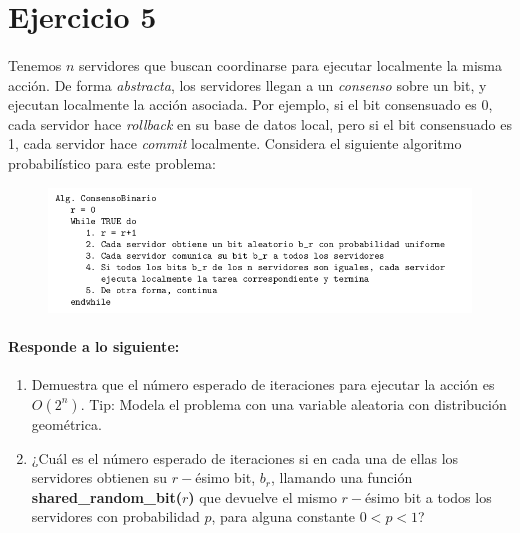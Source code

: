 \documentclass[12pt]{article}
\begin{document}
\section{Ejercicio 5}
\paragraph{} Tenemos $n$ servidores que buscan coordinarse para ejecutar localmente la misma acción. De forma \textit{abstracta}, los servidores llegan a un \textit{consenso} sobre un bit, y ejecutan localmente la acción asociada. Por ejemplo, si el bit consensuado es 0, cada servidor hace \textit{rollback} en su base de datos local, pero si el bit consensuado es 1, cada servidor hace \textit{commit} localmente. Considera el siguiente algoritmo probabilístico para este problema:
\begin{figure}[h]
	\begin{center}
		\includegraphics[width=\textwidth]{AlgoProba}
	\end{center}
\end{figure}
\paragraph{Responde a lo siguiente:}
\begin{enumerate}
	\item Demuestra que el número esperado de iteraciones para ejecutar la acción es $O(2^n)$. Tip: Modela el problema con una variable aleatoria con distribución geométrica.
	\item ¿Cuál es el número esperado de iteraciones si en cada una de ellas los servidores obtienen su $r-$ésimo bit, $b_r$, llamando una función \textbf{shared\_random\_bit($r$)} que devuelve el mismo $r-$ésimo bit a todos los servidores con probabilidad $p$, para alguna constante $0 < p < 1$?
\end{enumerate}
\end{document}
